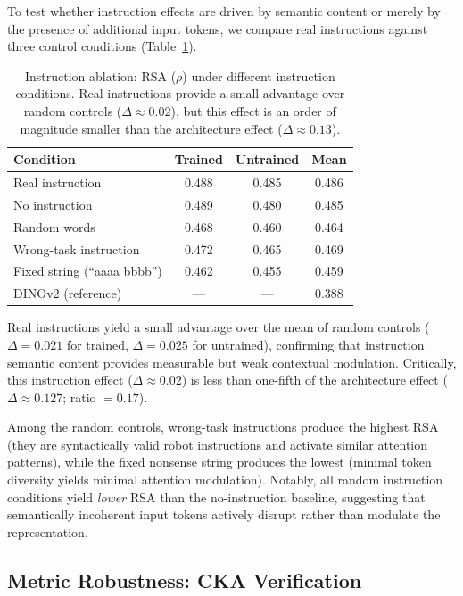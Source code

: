 \documentclass[letterpaper]{article}
\begin{document}
To test whether instruction effects are driven by semantic content or merely by the presence of additional input tokens, we compare real instructions against three control conditions (Table~\ref{tab:random_inst}).

\begin{table}[t]
\centering
\caption{Instruction ablation: RSA ($\rho$) under different instruction conditions. Real instructions provide a small advantage over random controls ($\Delta\approx0.02$), but this effect is an order of magnitude smaller than the architecture effect ($\Delta\approx0.13$).}
\label{tab:random_inst}
\begin{tabular}{lccc}
\toprule
\textbf{Condition} & \textbf{Trained} & \textbf{Untrained} & \textbf{Mean} \\
\midrule
Real instruction & 0.488 & 0.485 & 0.486 \\
No instruction & 0.489 & 0.480 & 0.485 \\
Random words & 0.468 & 0.460 & 0.464 \\
Wrong-task instruction & 0.472 & 0.465 & 0.469 \\
Fixed string (``aaaa bbbb'') & 0.462 & 0.455 & 0.459 \\
\midrule
DINOv2 (reference) & --- & --- & 0.388 \\
\bottomrule
\end{tabular}
\end{table}

Real instructions yield a small advantage over the mean of random controls ($\Delta=0.021$ for trained, $\Delta=0.025$ for untrained), confirming that instruction semantic content provides measurable but weak contextual modulation.
Critically, this instruction effect ($\Delta\approx0.02$) is less than one-fifth of the architecture effect ($\Delta\approx0.127$; ratio $= 0.17$).

Among the random controls, wrong-task instructions produce the highest RSA (they are syntactically valid robot instructions and activate similar attention patterns), while the fixed nonsense string produces the lowest (minimal token diversity yields minimal attention modulation).
Notably, all random instruction conditions yield \emph{lower} RSA than the no-instruction baseline, suggesting that semantically incoherent input tokens actively disrupt rather than modulate the representation.

\subsection{Metric Robustness: CKA Verification}
\label{sec:exp_cka}
\end{document}
